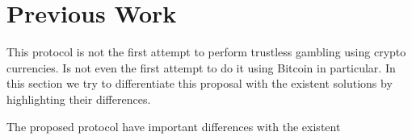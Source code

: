 \section{Previous Work}

This protocol is not the first attempt to perform trustless gambling using
  crypto currencies.
Is not even the first attempt to do it using Bitcoin in particular.
In this section we try to differentiate this proposal with the existent
  solutions by highlighting their differences.


The proposed protocol have important differences with the existent
